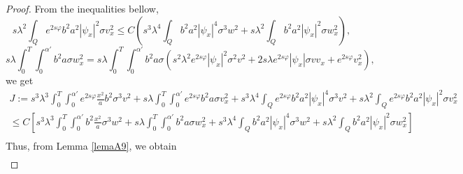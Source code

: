 \documentclass[11pt,oneside,a4papper]{osajnl}
\begin{document}
\begin{proof}
	From the inequalities bellow,
	$$s \lambda^2\int_Q e^{2s\varphi}b^2 a^2 |\psi_x|^2 \sigma v_x^2\leq  C\left( s^3 \lambda^4 \int_Q b^2 a^2|\psi_x|^4\sigma^3 w^2 + s \lambda^2 \int_Qb^2 a^2|\psi_x|^2\sigma w_x^2\right),$$
	$$s \lambda \int_0^T \int_0^{\alpha'} b^2 a \sigma w_x^2=
	s \lambda \int_0^T \int_0^{\alpha'} b^2 a \sigma (s^2\lambda^2e^{2s\varphi}|\psi_x|^2\sigma^2  v^2+2s\lambda e^{2s\varphi}|\psi_x|\sigma  v v_x+e^{2s\varphi}v_x^2),$$
    we get 
	\begin{multline*}
		J:=s^3 \lambda^3 \int_0^T \int_0^{\alpha'} e^{2s\varphi} \frac{x^2}{a} b^2\sigma^3 v^2 +s \lambda \int_0^T \int_0^{\alpha'} e^{2s\varphi} b^2 a \sigma v_x^2+s^3 \lambda^4 \int_Q e^{2s\varphi}b^2 a^2|\psi_x|^4 \sigma^3 v^2
		+s \lambda^2 \int_Q e^{2s\varphi}b^2 a^2 |\psi_x|^2 \sigma v_x^2\\
		\leq C \left[  s^3 \lambda^3 \int_0^T \int_0^{\alpha'} b^2 \frac{x^2}{a} \sigma^3 w^2 +s \lambda \int_0^T \int_0^{\alpha'} b^2 a \sigma w_x^2+s^3 \lambda^4 \int_Q b^2 a^2|\psi_x|^4 \sigma^3 w^2+s \lambda^2 \int_Q b^2 a^2 |\psi_x|^2 \sigma w_x^2 \right] \\
	\end{multline*}
    Thus, from Lemma \ref{lemaA9}, we obtain
	\begin{equation}\label{ecA4}
        \begin{split}

\end{split}
\end{equation}
\end{proof}
\end{document}
